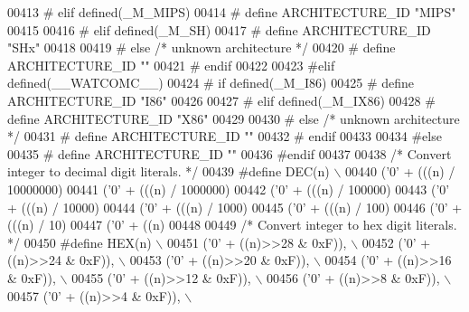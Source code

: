 \begin{DoxyCode}
{{{{{{{{{{{{{{{{{{{{{{{{{{{{{{{{{{{{00413 \textcolor{preprocessor}{# elif defined(\_M\_MIPS)}
00414 \textcolor{preprocessor}{#  define ARCHITECTURE\_ID "MIPS"}
00415 
00416 \textcolor{preprocessor}{# elif defined(\_M\_SH)}
00417 \textcolor{preprocessor}{#  define ARCHITECTURE\_ID "SHx"}
00418 
00419 \textcolor{preprocessor}{# else }\textcolor{comment}{/* unknown architecture */}\textcolor{preprocessor}{}
00420 \textcolor{preprocessor}{#  define ARCHITECTURE\_ID ""}
00421 \textcolor{preprocessor}{# endif}
00422 
00423 \textcolor{preprocessor}{#elif defined(\_\_WATCOMC\_\_)}
00424 \textcolor{preprocessor}{# if defined(\_M\_I86)}
00425 \textcolor{preprocessor}{#  define ARCHITECTURE\_ID "I86"}
00426 
00427 \textcolor{preprocessor}{# elif defined(\_M\_IX86)}
00428 \textcolor{preprocessor}{#  define ARCHITECTURE\_ID "X86"}
00429 
00430 \textcolor{preprocessor}{# else }\textcolor{comment}{/* unknown architecture */}\textcolor{preprocessor}{}
00431 \textcolor{preprocessor}{#  define ARCHITECTURE\_ID ""}
00432 \textcolor{preprocessor}{# endif}
00433 
00434 \textcolor{preprocessor}{#else}
00435 \textcolor{preprocessor}{#  define ARCHITECTURE\_ID ""}
00436 \textcolor{preprocessor}{#endif}
00437 
00438 \textcolor{comment}{/* Convert integer to decimal digit literals.  */}
00439 \textcolor{preprocessor}{#define DEC(n)                   \(\backslash\)}
00440 \textcolor{preprocessor}{  ('0' + (((n) / 10000000)%
00441 \textcolor{preprocessor}{  ('0' + (((n) / 1000000)%
00442 \textcolor{preprocessor}{  ('0' + (((n) / 100000)%
00443 \textcolor{preprocessor}{  ('0' + (((n) / 10000)%
00444 \textcolor{preprocessor}{  ('0' + (((n) / 1000)%
00445 \textcolor{preprocessor}{  ('0' + (((n) / 100)%
00446 \textcolor{preprocessor}{  ('0' + (((n) / 10)%
00447 \textcolor{preprocessor}{  ('0' +  ((n) %
00448 
00449 \textcolor{comment}{/* Convert integer to hex digit literals.  */}
00450 \textcolor{preprocessor}{#define HEX(n)             \(\backslash\)}
00451 \textcolor{preprocessor}{  ('0' + ((n)>>28 & 0xF)), \(\backslash\)}
00452 \textcolor{preprocessor}{  ('0' + ((n)>>24 & 0xF)), \(\backslash\)}
00453 \textcolor{preprocessor}{  ('0' + ((n)>>20 & 0xF)), \(\backslash\)}
00454 \textcolor{preprocessor}{  ('0' + ((n)>>16 & 0xF)), \(\backslash\)}
00455 \textcolor{preprocessor}{  ('0' + ((n)>>12 & 0xF)), \(\backslash\)}
00456 \textcolor{preprocessor}{  ('0' + ((n)>>8  & 0xF)), \(\backslash\)}
00457 \textcolor{preprocessor}{  ('0' + ((n)>>4  & 0xF)), \(\backslash\)}
}}}}}}}}}}}}}}}}}}}}}}}}}}}}}}}}}}}}}}}}}}}}
\end{DoxyCode}
